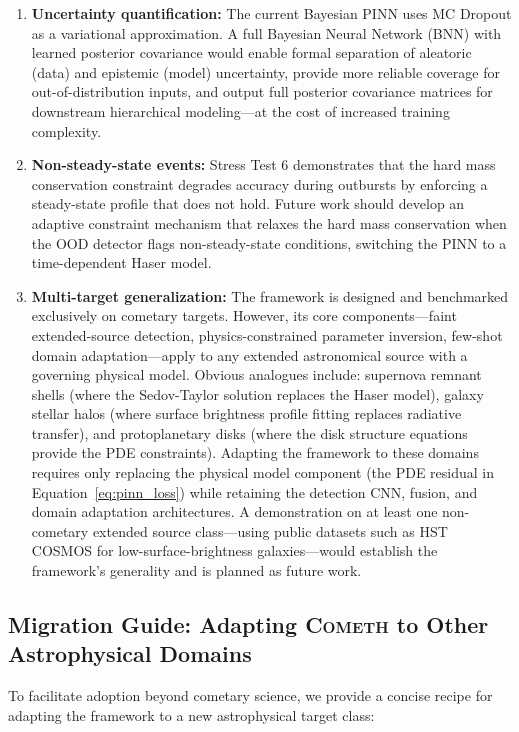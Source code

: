 \documentclass[preprint2]{aastex631}
\begin{document}
\begin{enumerate}
    \item \textbf{Uncertainty quantification:} The current Bayesian PINN uses MC Dropout as a variational approximation. A full Bayesian Neural Network (BNN) with learned posterior covariance would enable formal separation of aleatoric (data) and epistemic (model) uncertainty, provide more reliable coverage for out-of-distribution inputs, and output full posterior covariance matrices for downstream hierarchical modeling---at the cost of increased training complexity.
    \item \textbf{Non-steady-state events:} Stress Test 6 demonstrates that the hard mass conservation constraint degrades accuracy during outbursts by enforcing a steady-state profile that does not hold. Future work should develop an adaptive constraint mechanism that relaxes the hard mass conservation when the OOD detector flags non-steady-state conditions, switching the PINN to a time-dependent Haser model.
    \item \textbf{Multi-target generalization:} The framework is designed and benchmarked exclusively on cometary targets. However, its core components---faint extended-source detection, physics-constrained parameter inversion, few-shot domain adaptation---apply to any extended astronomical source with a governing physical model. Obvious analogues include: supernova remnant shells (where the Sedov-Taylor solution replaces the Haser model), galaxy stellar halos (where surface brightness profile fitting replaces radiative transfer), and protoplanetary disks (where the disk structure equations provide the PDE constraints). Adapting the framework to these domains requires only replacing the physical model component (the PDE residual in Equation~\ref{eq:pinn_loss}) while retaining the detection CNN, fusion, and domain adaptation architectures. A demonstration on at least one non-cometary extended source class---using public datasets such as HST COSMOS for low-surface-brightness galaxies---would establish the framework's generality and is planned as future work.
\end{enumerate}

\subsection{Migration Guide: Adapting \texorpdfstring{\textsc{Cometh}}{COMETH} to Other Astrophysical Domains}

To facilitate adoption beyond cometary science, we provide a concise recipe for adapting the framework to a new astrophysical target class:
\end{document}
